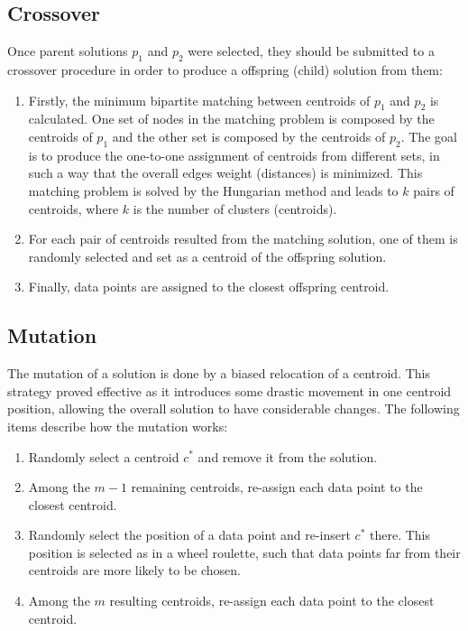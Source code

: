 \subsection{Crossover}
Once parent solutions $p_1$ and $p_2$ were selected, they should be submitted to a crossover procedure in order to produce a offspring (child) solution from them:

\begin{enumerate}
	\item Firstly, the minimum bipartite matching between centroids of $p_1$ and $p_2$ is calculated. One set of nodes in the matching problem is composed by the centroids of $p_1$ and the other set is composed by the centroids of $p_2$. The goal is to produce the one-to-one assignment of centroids from different sets, in such a way that the overall edges weight (distances) is minimized. This matching problem is solved by the Hungarian method and leads to $k$ pairs of centroids, where $k$ is the number of clusters (centroids).

	\item For each pair of centroids resulted from the matching solution, one of them is randomly selected and set as a centroid of the offspring solution.

	\item Finally, data points are assigned to the closest offspring centroid.
\end{enumerate}

\subsection{Mutation}
The mutation of a solution is done by a biased relocation of a centroid. This strategy proved effective as it introduces some drastic movement in one centroid position, allowing the overall solution to have considerable changes. The following items describe how the mutation works:

\begin{enumerate}

	\item Randomly select a centroid $c^{*}$ and remove it from the solution.
	
	\item Among the $m-1$ remaining centroids, re-assign each data point to the closest centroid.
	
	\item Randomly select the position of a data point and re-insert $c^{*}$ there. This position is selected as in a wheel roulette, such that data points far from their centroids are more likely to be chosen.
	
	\item Among the $m$ resulting centroids, re-assign each data point to the closest centroid.
		
\end{enumerate}

